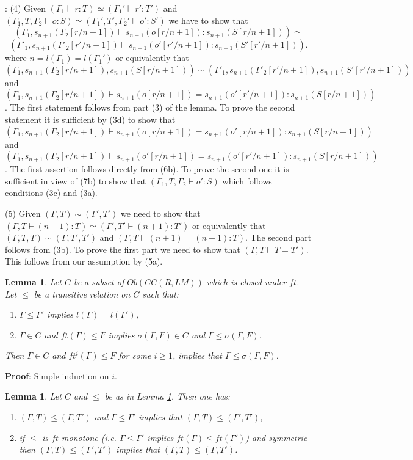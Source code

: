 \documentclass[11pt]{article}
\newenvironment{proof}{{\bf Proof}:}{\vskip 5mm }
\newtheorem{lemma}[proposition]{Lemma}
\newcommand{\llabel}[1]{\label{#1}}
\begin{document}
\begin{proof}
(4) Given $(\Gamma_1\vdash r:T)\simeq(\Gamma_1'\vdash r':T')$ and $(\Gamma_1,T,\Gamma_2\vdash o:S)\simeq(\Gamma_1',T',\Gamma_2'\vdash o':S')$ we have to show that 
%
$$(\Gamma_1,s_{n+1}(\Gamma_2[r/n+1])\vdash s_{n+1}(o[r/n+1]):s_{n+1}(S[r/n+1]))\simeq$$ 
$$ (\Gamma'_1,s_{n+1}(\Gamma'_2[r'/n+1])\vdash s_{n+1}(o'[r'/n+1]):s_{n+1}(S'[r'/n+1])).$$
%
%
where $n=l(\Gamma_1)=l(\Gamma_1')$ or equivalently that 
%
$$(\Gamma_1,s_{n+1}(\Gamma_2[r/n+1]),s_{n+1}(S[r/n+1]))\sim(\Gamma'_1,s_{n+1}(\Gamma'_2[r'/n+1]), s_{n+1}(S'[r'/n+1]))$$
%
and $(\Gamma_1,s_{n+1}(\Gamma_2[r/n+1])\vdash s_{n+1}(o[r/n+1])=s_{n+1}(o'[r'/n+1]):s_{n+1}(S[r/n+1]))$. The first statement follows from part (3) of the lemma. To prove the second statement it is sufficient by (3d) to show that  $(\Gamma_1,s_{n+1}(\Gamma_2[r/n+1])\vdash s_{n+1}(o[r/n+1])=s_{n+1}(o'[r/n+1]):s_{n+1}(S[r/n+1]))$ and  $(\Gamma_1,s_{n+1}(\Gamma_2[r/n+1])\vdash s_{n+1}(o'[r/n+1])=s_{n+1}(o'[r'/n+1]):s_{n+1}(S[r/n+1]))$. The first assertion follows directly from (6b). To prove the second one it is sufficient in view of (7b) to show that $(\Gamma_1,T,\Gamma_2\vdash o':S)$ which follows conditions (3c) and (3a).

(5) Given $(\Gamma,T)\sim(\Gamma',T')$ we need to show that $(\Gamma,T\vdash (n+1):T)\simeq(\Gamma',T'\vdash (n+1):T')$ or equivalently that $(\Gamma,T,T)\sim(\Gamma,T',T')$ and $(\Gamma,T\vdash (n+1)=(n+1):T)$. The second part follows from (3b). To prove the first part we need to show that $(\Gamma,T\vdash T=T')$. This follows from our assumption by (5a). 
\end{proof}
%
\begin{lemma}
\llabel{2014.07.12.l1}
Let $C$ be a subset of $Ob(CC(R,LM))$ which is closed under $ft$. Let $\le$ be a transitive relation on $C$ such that:
%
\begin{enumerate}
\item $\Gamma\le \Gamma'$ implies $l(\Gamma)=l(\Gamma')$,
\item $\Gamma\in C$ and $ft(\Gamma)\le F$ implies $\sigma(\Gamma,F)\in C$ and $\Gamma\le \sigma(\Gamma,F)$.
\end{enumerate}
%
Then $\Gamma\in C$ and $ft^i(\Gamma)\le F$ for some $i\ge 1$, implies that $\Gamma\le \sigma(\Gamma,F)$. 
\end{lemma}
%
\begin{proof}
Simple induction on $i$.
\end{proof}
%
\begin{lemma}
\llabel{2014.07.12.l2}
Let $C$ and $\le$ be as in Lemma \ref{2014.07.12.l1}. Then one has:
%
\begin{enumerate}
\item $(\Gamma,T)\le (\Gamma,T')$ and $\Gamma\le \Gamma'$ implies that $(\Gamma,T)\le (\Gamma',T')$,
\item if $\le$ is $ft$-monotone (i.e. $\Gamma\le \Gamma'$ implies $ft(\Gamma)\le ft(\Gamma')$) and symmetric then $(\Gamma,T)\le (\Gamma',T')$ implies that $(\Gamma,T)\le (\Gamma,T')$.
\end{enumerate}
\end{lemma}
\end{document}
